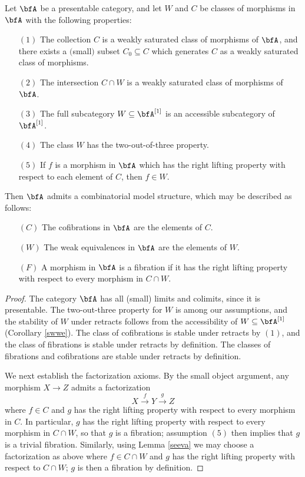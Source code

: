 \begin{Model Categories}
\begin{proposition}\label{bigmaker}
Let $\bfA$ be a presentable category, and let $W$ and $C$ be classes of morphisms
in $\bfA$ with the following properties:
\begin{itemize}
\item[$(1)$] The collection $C$ is a weakly saturated class of morphisms of $\bfA$, and there exists a $($small$)$ subset $C_0 \subseteq C$ which generates $C$ as a weakly saturated class of morphisms.
\item[$(2)$] The intersection $C \cap W$ is a weakly saturated class of morphisms of $\bfA$.
\item[$(3)$] The full subcategory $W \subseteq \bfA^{[1]}$ is an accessible subcategory
of $\bfA^{[1]}$.
\item[$(4)$] The class $W$ has the two-out-of-three property.
\item[$(5)$] If $f$ is a morphism in $\bfA$ which has the right lifting property with respect to each element of $C$, then $f \in W$.
\end{itemize}
Then $\bfA$ admits a combinatorial model structure, which may be described as follows:
\begin{itemize}
\item[$(C)$] The cofibrations in $\bfA$ are the elements of $C$.
\item[$(W)$] The weak equivalences in $\bfA$ are the elements of $W$.
\item[$(F)$] A morphism in $\bfA$ is a fibration if it has the right lifting property with respect to every morphism in $C \cap W$.
\end{itemize}
\end{proposition}

\begin{proof}
The category $\bfA$ has all (small) limits and colimits, since it is presentable. The two-out-three property for $W$ is among our assumptions, and the stability of $W$ under retracts follows from the accessibility of $W \subseteq \bfA^{[1]}$ (Corollary \ref{swwe}). The class of cofibrations is stable under retracts by $(1)$, and the class of fibrations is stable under retracts by definition.
The classes of fibrations and cofibrations are stable under retracts by definition.

We next establish the factorization axioms. By the small object argument, any morphism
$X \rightarrow Z$ admits a factorization
$$X \stackrel{f}{\rightarrow} Y \stackrel{g}{\rightarrow} Z$$
where $f \in C$ and $g$ has the right lifting property with respect to every morphism in $C$.
In particular, $g$ has the right lifting property with respect to every morphism in $C \cap W$, so that $g$ is a fibration; assumption $(5)$ then implies that $g$ is a trivial fibration.
Similarly, using Lemma \ref{seeva} we may choose a factorization as above where $f \in C \cap W$ and $g$ has the right lifting property with respect to $C \cap W$; $g$ is then a fibration by definition.


\end{proof}
\end{Model Categories}
